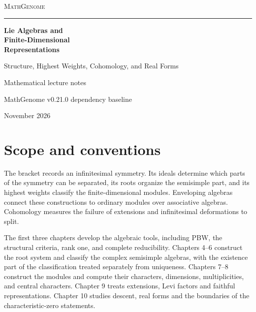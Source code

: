 \documentclass[11pt,oneside,openany]{book}
\theoremstyle{definition}
\theoremstyle{remark}
\begin{document}
\frontmatter
\hypersetup{pageanchor=false}
\begin{titlepage}
\thispagestyle{empty}
\begin{flushleft}
\vspace*{0.65in}
{\large\scshape\color{deepgreen}MathGenome\par}
\vspace{0.35in}
{\color{rulegreen}\rule{0.94\textwidth}{0.65pt}\par}
\vspace{0.43in}
{\color{ink}\fontsize{34}{40}\selectfont\bfseries
Lie Algebras and\\[5pt]Finite-Dimensional\\[5pt]Representations\par}
\vspace{0.35in}
{\color{deepgreen}\Large Structure, Highest Weights, Cohomology, and Real Forms\par}
\vfill
{\large Mathematical lecture notes\par}
\vspace{0.12in}
{\normalsize MathGenome v0.21.0 dependency baseline\par}
{\normalsize November 2026\par}
\vspace*{0.45in}
\end{flushleft}
\end{titlepage}
\hypersetup{pageanchor=true}
\begingroup\small\tableofcontents\endgroup

\chapter*{Scope and conventions}
The bracket records an infinitesimal symmetry. Its ideals determine
which parts of the symmetry can be separated, its roots organize the
semisimple part, and its highest weights classify the finite-dimensional
modules. Enveloping algebras connect these constructions to ordinary
modules over associative algebras. Cohomology measures the failure of
extensions and infinitesimal deformations to split.

The first three chapters develop the algebraic tools, including PBW,
the structural criteria, rank one, and complete reducibility. Chapters
4--6 construct the root system and classify the complex semisimple
algebras, with the existence part of the classification treated
separately from uniqueness. Chapters 7--8 construct the modules and
compute their characters, dimensions, multiplicities, and central
characters. Chapter 9 treats extensions, Levi factors and faithful
representations. Chapter 10 studies descent, real forms and the
boundaries of the characteristic-zero statements.
\end{document}
